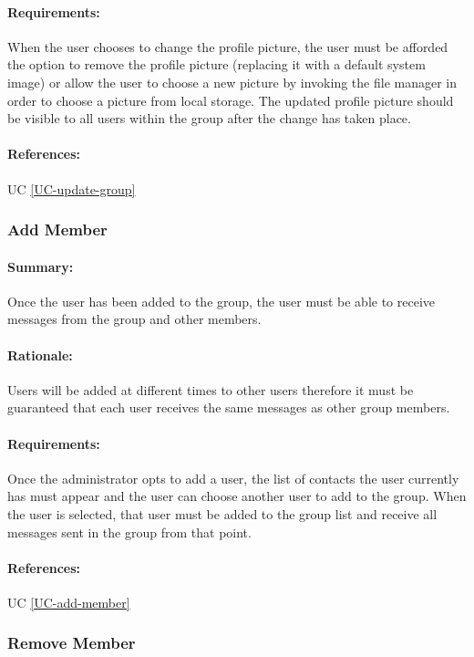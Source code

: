 \documentclass[11pt]{article}
\begin{document}
\paragraph{Requirements:}
When the user chooses to change the profile picture, the user must be afforded the option to remove the profile picture (replacing it with a default system image) or allow the user to choose a new picture by invoking the file manager in order to choose a picture from local storage. The updated profile picture should be visible to all users within the group after the change has taken place.
\paragraph{References:} UC \ref{UC-update-group}

\subsubsection{Add Member} \label{FR-add-member}
\paragraph{Summary:}
Once the user has been added to the group, the user must be able to receive messages from the group and other members.
\paragraph{Rationale:}
Users will be added at different times to other users therefore it must be guaranteed that each user receives the same messages as other group members.
\paragraph{Requirements:}
Once the administrator opts to add a user, the list of contacts the user currently has must appear and the user can choose another user to add to the group. When the user is selected, that user must be added to the group list and receive all messages sent in the group from that point.
\paragraph{References:} UC \ref{UC-add-member}

\subsubsection{Remove Member} \label{FR-remove-member}
\end{document}
